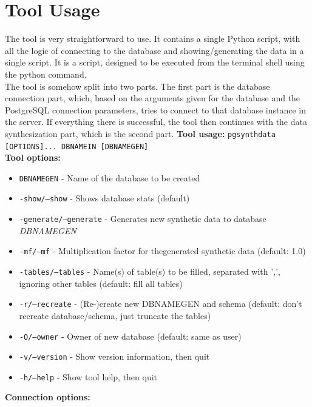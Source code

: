 \section{Tool Usage}
The tool is very straightforward to use. It contains a single Python script, with all the logic of connecting to the database and showing/generating the data in a single script. It is a script, designed to be executed from the terminal shell using the python command.\\
\newline
The tool is somehow split into two parts. The first part is the database connection part, which, based on the arguments given for the database and the PostgreSQL connection parameters, tries to connect to that database instance in the server. If everything there is successful, the tool then continues with the data synthesization part, which is the second part.
\newline
\textbf{Tool usage:} \newline
\texttt{pgsynthdata [OPTIONS]... DBNAMEIN [DBNAMEGEN]} \\
\newline
\textbf{Tool options:}
\begin{itemize}
\item \texttt{DBNAMEGEN} - Name of the database to be created
\item \texttt{-show/--show} - Shows database stats (default)
\item \texttt{-generate/--generate} - Generates new synthetic data to database \textit{DBNAMEGEN}
\item \texttt{-mf/--mf} - Multiplication factor for thegenerated synthetic data (default: 1.0)
\item \texttt{-tables/--tables} - Name(s) of table(s) to be filled, separated with ',', ignoring other tables (default: fill all tables)
\item \texttt{-r/--recreate} - (Re-)create new DBNAMEGEN and schema (default: don't recreate database/schema, just truncate the tables)
\item \texttt{-O/--owner} - Owner of new database (default: same as user)
\item \texttt{-v/--version} - Show version information, then quit
\item \texttt{-h/--help} - Show tool help, then quit
\newline
\end{itemize}
\textbf{Connection options:}
